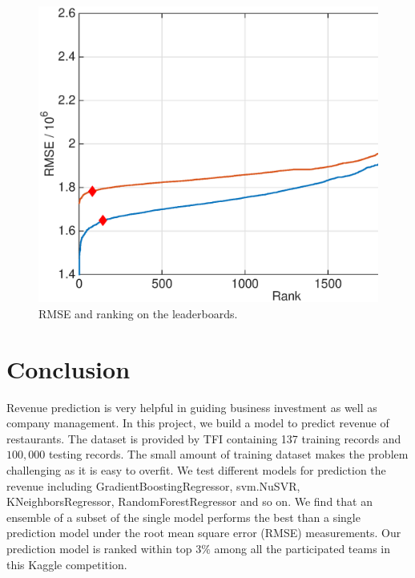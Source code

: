 \documentclass[10pt, oneside]{article}   	%
\begin{document}
\begin{figure}[h]
   \centering
   \includegraphics[width=5.8in]{figs/pb.eps} 
   \caption{RMSE and ranking on the leaderboards.}
   \label{fig:pb}
\end{figure}



\section{Conclusion} 
Revenue prediction is very helpful in guiding business investment as well as company management. In this project, we build a model to predict revenue of restaurants. The dataset is provided by TFI containing 137 training records and $100,000$ testing records. The small amount of training dataset makes the problem challenging as it is easy to overfit. We test different models for prediction the revenue including GradientBoostingRegressor, svm.NuSVR, KNeighborsRegressor, RandomForestRegressor and so on. We find that an ensemble of a subset of the single model performs the best than a single prediction model under the root mean square error (RMSE) measurements. Our prediction model is ranked within top $3\%$ among all the participated teams in this Kaggle competition.
\end{document}
